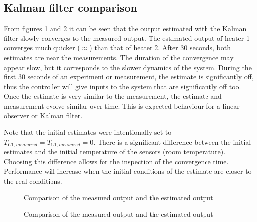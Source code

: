 \subsection{Kalman filter comparison}
From figures \ref{fig:comp_Kalman1} and \ref{fig:comp_Kalman2} it can be seen that the output estimated with the Kalman filter slowly converges to the measured output. The estimated output of heater 1 converges much quicker ($\approx $) than that of heater 2. After 30 seconds, both estimates are near the measurements. The duration of the convergence may appear slow, but it corresponds to the slower dynamics of the system. During the first 30 seconds of an experiment or measurement, the estimate is significantly off, thus the controller will give inputs to the system that are significantly off too. Once the estimate is very similar to the measurement, the estimate and measurement evolve similar over time. This is expected behaviour for a linear observer or Kalman filter.

Note that the initial estimates were intentionally set to $T_{C1,measured} = T_{C1,measured} = 0$. There is a significant difference between the initial estimates and the initial temperature of the sensors (room temperature). Choosing this difference allows for the inspection of the convergence time. Performance will increase when the initial conditions of the estimate are closer to the real conditions.

\begin{figure}
    \centering
    
    \caption{Comparison of the measured output and the estimated output}
    \label{fig:comp_Kalman1}
\end{figure}
\begin{figure}
    \centering
    
    \caption{Comparison of the measured output and the estimated output}
    \label{fig:comp_Kalman2}
\end{figure}